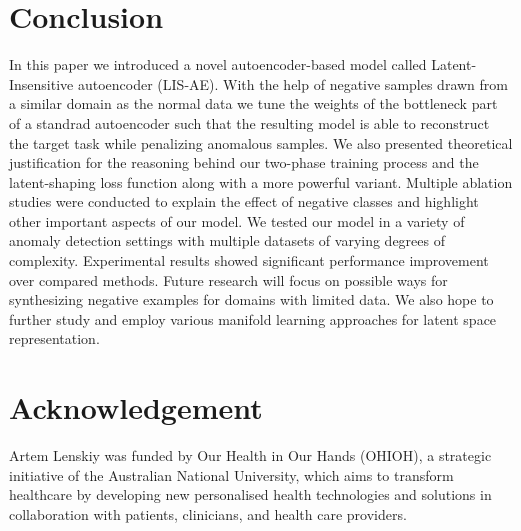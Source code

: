 \documentclass[acmtog, nonacm]{acmart}
\begin{document}
\section{Conclusion}

In this paper we introduced a novel autoencoder-based model called Latent-Insensitive autoencoder (LIS-AE). With the help of negative samples drawn from a similar domain as the normal data we tune the weights of the bottleneck part of a standrad autoencoder such that the resulting model is able to reconstruct the target task while penalizing anomalous samples. We also presented theoretical justification for the reasoning behind our two-phase training process and the latent-shaping loss function along with a more powerful variant. Multiple ablation studies were conducted to explain the effect of negative classes and highlight other important aspects of our model. We tested our model in a variety of anomaly detection settings with multiple datasets of varying degrees of complexity. Experimental results showed significant performance improvement over compared methods. Future research will focus on possible ways for synthesizing negative examples for domains with limited data. We also hope to further study and employ various manifold learning approaches for latent space representation. 

\section*{Acknowledgement}
Artem Lenskiy was funded by Our Health in Our Hands (OHIOH), a strategic initiative of the Australian National University, which aims to transform healthcare by developing new personalised health technologies and solutions in collaboration with patients, clinicians, and health care providers.
















\onecolumn
\appendix
\end{document}
